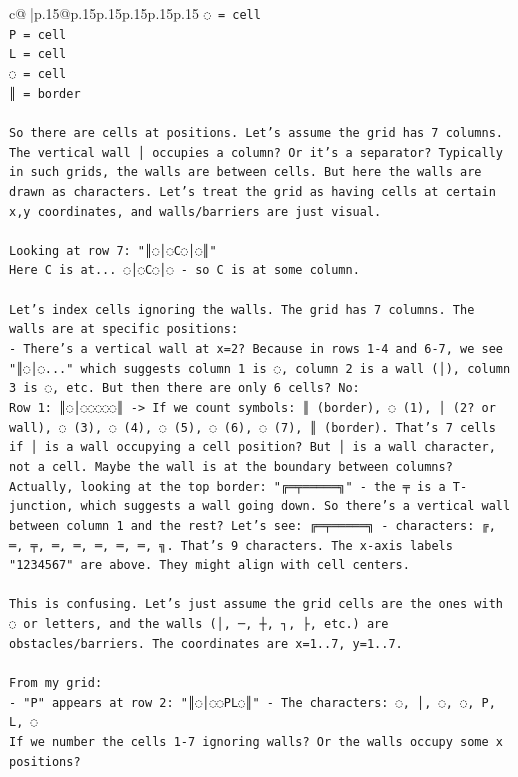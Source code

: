 \documentclass{article}
\begin{document}
{\begin{supertabular}{c@{$\;$}|p{.15\linewidth}@{}p{.15\linewidth}p{.15\linewidth}p{.15\linewidth}p{.15\linewidth}p{.15\linewidth}}
{{{\texttt{◌ = cell} \\
\texttt{P = cell} \\
\texttt{L = cell} \\
\texttt{◌ = cell} \\
\texttt{║ = border} \\
\\ 
\texttt{So there are cells at positions. Let's assume the grid has 7 columns. The vertical wall │ occupies a column? Or it's a separator? Typically in such grids, the walls are between cells. But here the walls are drawn as characters. Let's treat the grid as having cells at certain x,y coordinates, and walls/barriers are just visual.} \\
\\ 
\texttt{Looking at row 7: "║◌│◌C◌│◌║"} \\
\texttt{Here C is at... ◌│◌C◌│◌ {-} so C is at some column.} \\
\\ 
\texttt{Let's index cells ignoring the walls. The grid has 7 columns. The walls are at specific positions:} \\
\texttt{{-} There's a vertical wall at x=2? Because in rows 1{-}4 and 6{-}7, we see "║◌│◌..." which suggests column 1 is ◌, column 2 is a wall (│), column 3 is ◌, etc. But then there are only 6 cells? No:} \\
\texttt{Row 1: ║◌│◌◌◌◌◌║ {-}> If we count symbols: ║ (border), ◌ (1), │ (2? or wall), ◌ (3), ◌ (4), ◌ (5), ◌ (6), ◌ (7), ║ (border). That's 7 cells if │ is a wall occupying a cell position? But │ is a wall character, not a cell. Maybe the wall is at the boundary between columns? Actually, looking at the top border: "╔═╤═════╗" {-} the ╤ is a T{-}junction, which suggests a wall going down. So there's a vertical wall between column 1 and the rest? Let's see: ╔═╤═════╗ {-} characters: ╔, ═, ╤, ═, ═, ═, ═, ═, ╗. That's 9 characters. The x{-}axis labels "1234567" are above. They might align with cell centers.} \\
\\ 
\texttt{This is confusing. Let's just assume the grid cells are the ones with ◌ or letters, and the walls (│, ─, ┼, ┐, ├, etc.) are obstacles/barriers. The coordinates are x=1..7, y=1..7.} \\
\\ 
\texttt{From my grid:} \\
\texttt{{-} "P" appears at row 2: "║◌│◌◌PL◌║" {-} The characters: ◌, │, ◌, ◌, P, L, ◌} \\
\texttt{If we number the cells 1{-}7 ignoring walls? Or the walls occupy some x positions?} \\
}}}
\end{supertabular}}
\end{document}
